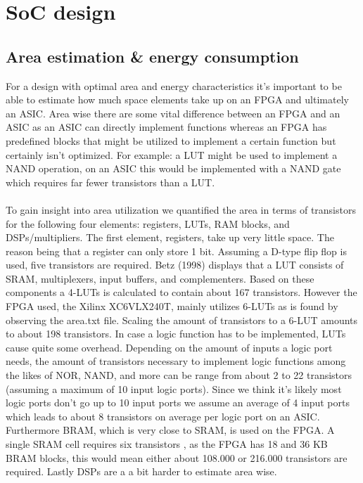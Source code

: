 \section{SoC design}
\subsection{Area estimation & energy consumption}
For a design with optimal area and energy characteristics it's important to be able to estimate how much space elements take up on an FPGA and ultimately an ASIC. Area wise there are some vital difference between an FPGA and an ASIC as an ASIC can directly implement functions whereas an FPGA has predefined blocks that might be utilized to implement a certain function but certainly isn't optimized. For example: a LUT might be used to implement a NAND operation, on an ASIC this would be implemented with a NAND gate which requires far fewer transistors than a LUT.\\\\
To gain insight into area utilization we quantified the area in terms of transistors for the following four elements: registers, LUTs, RAM blocks, and DSPs/multipliers. The first element, registers, take up very little space. The reason being that a register can only store 1 bit. Assuming a D-type flip flop is used, five transistors are required. %
Betz (1998) displays that a LUT consists of SRAM, multiplexers, input buffers, and complementers. Based on these components a 4-LUTs is calculated to contain about 167 transistors. However the FPGA used, the Xilinx XC6VLX240T, mainly utilizes 6-LUTs as is found by observing the area.txt file. Scaling the amount of transistors to a 6-LUT amounts to about 198 transistors. In case a logic function has to be implemented, LUTs cause quite some overhead. Depending on the amount of inputs a logic port needs, the amount of transistors necessary to implement logic functions among the likes of NOR, NAND, and more can be range from about 2 to 22 transistors (assuming a maximum of 10 input logic ports). Since we think it's likely most logic ports don't go up to 10 input ports we assume an average of 4 input ports which leads to about 8 transistors on average per logic port on an ASIC.\\
Furthermore BRAM, which is very close to SRAM, is used on the FPGA. A single SRAM cell requires six transistors  %
, as the FPGA has 18 and 36 KB BRAM blocks, this would mean either about 108.000 or 216.000 transistors are required. Lastly DSPs are a a bit harder to estimate area wise. %
